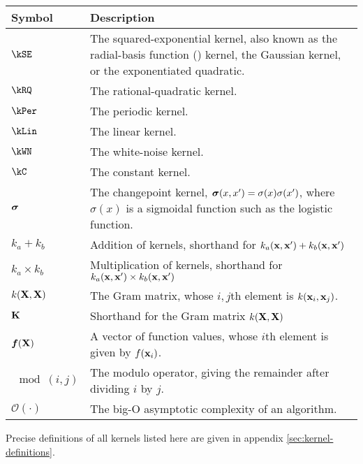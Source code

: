 \begin{tabular}{lm{12cm}}
Symbol \quad     & Description \\
\hline
$\kSE$ & The squared-exponential kernel, also known as the radial-basis function (\RBF{}) kernel, the Gaussian kernel, or the exponentiated quadratic. \\
$\kRQ$ & The rational-quadratic kernel. \\
$\kPer$ & The periodic kernel. \\
$\kLin$ & The linear kernel. \\
$\kWN$ & The white-noise kernel. \\
$\kC$ & The constant kernel. \\
${\boldsymbol{\sigma}}$ & The changepoint kernel, ${\boldsymbol{\sigma}}(x, x') = \sigma(x) \sigma(x')$, where $\sigma(x)$ is a sigmoidal function such as the logistic function. \\
$k_a + k_b$ & Addition of kernels, shorthand for $k_a({\bf{x}}, {\bf{x}}') + k_b({\bf{x}}, {\bf{x}}')$ \\
$k_a \times k_b$& Multiplication of kernels, shorthand for $k_a({\bf{x}}, {\bf{x}}') \times k_b({\bf{x}}, {\bf{x}}')$ \\
$k(\mathbf{X}, \mathbf{X})$ & The Gram matrix, whose $i,j$th element is $k({\bf{x}}_i, {\bf{x}}_j)$. \\
$\mathbf{K}$ & Shorthand for the Gram matrix $k(\mathbf{X}, \mathbf{X})$ \\
$\boldsymbol{f}(\mathbf{X})$ & A vector of function values, whose $i$th element is given by $f({\bf{x}}_i)$. \\
$\mod(i,j)$ & The modulo operator, giving the remainder after dividing $i$ by $j$. \\
$\mathcal{O}(\cdot)$ & The big-O asymptotic complexity of an algorithm.
\end{tabular}

\vspace{1cm}
Precise definitions of all kernels listed here are given in appendix \ref{sec:kernel-definitions}.


\outbpdocument{
}


